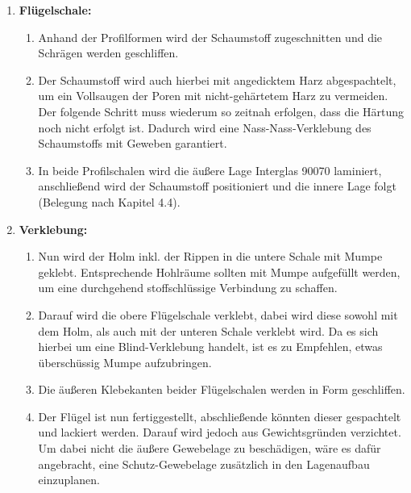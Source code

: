 \begin{enumerate}
\begin{enumerate}
	\end{enumerate}
	\item \textbf{Flügelschale:}
	\begin{enumerate}
		\item Anhand der Profilformen wird der Schaumstoff zugeschnitten und die Schrägen werden geschliffen.
		\item Der Schaumstoff wird auch hierbei mit angedicktem Harz \glqq abgespachtelt\grqq, um ein Vollsaugen der Poren mit nicht-gehärtetem Harz zu vermeiden. Der folgende Schritt muss wiederum so zeitnah erfolgen, dass die Härtung noch nicht erfolgt ist. Dadurch wird eine Nass-Nass-Verklebung des Schaumstoffs mit Geweben garantiert.
		\item In beide Profilschalen wird die äußere Lage Interglas 90070 laminiert, anschließend wird der Schaumstoff positioniert und die innere Lage folgt (Belegung nach Kapitel 4.4).
	\end{enumerate}
	\item \textbf{Verklebung:}
	\begin{enumerate}
		\item Nun wird der Holm inkl. der Rippen in die untere Schale mit Mumpe geklebt. Entsprechende Hohlräume sollten mit Mumpe aufgefüllt werden, um eine durchgehend stoffschlüssige Verbindung zu schaffen.
		\item Darauf wird die obere Flügelschale verklebt, dabei wird diese sowohl mit dem Holm, als auch mit der unteren Schale verklebt wird. Da es sich hierbei um eine Blind-Verklebung handelt, ist es zu Empfehlen, etwas überschüssig Mumpe aufzubringen.
		\item Die äußeren Klebekanten beider Flügelschalen werden in Form geschliffen.
		\item Der Flügel ist nun fertiggestellt, abschließende könnten dieser gespachtelt und lackiert werden. Darauf wird jedoch aus Gewichtsgründen verzichtet. Um dabei nicht die äußere Gewebelage zu beschädigen, wäre es dafür angebracht, eine Schutz-Gewebelage zusätzlich in den Lagenaufbau einzuplanen.
	\end{enumerate}
\end{enumerate}

